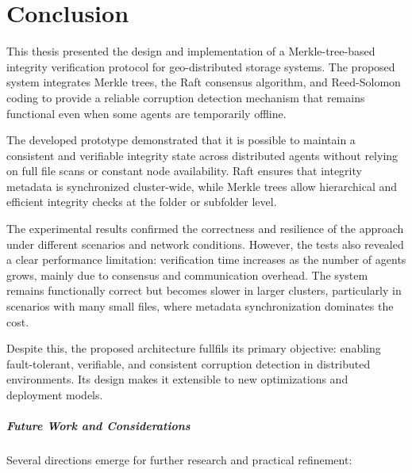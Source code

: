 \chapter{Conclusion}

This thesis presented the design and implementation of a Merkle-tree-based integrity verification protocol for geo-distributed storage systems.
The proposed system integrates Merkle trees, the Raft consensus algorithm, and Reed-Solomon coding to provide a reliable corruption detection mechanism that remains functional even when some agents are temporarily offline.

The developed prototype demonstrated that it is possible to maintain a consistent and verifiable integrity state across distributed agents without relying on full file scans or constant node availability.
Raft ensures that integrity metadata is synchronized cluster-wide, while Merkle trees allow hierarchical and efficient integrity checks at the folder or subfolder level.

The experimental results confirmed the correctness and resilience of the approach under different scenarios and network conditions.
However, the tests also revealed a clear performance limitation: verification time increases as the number of agents grows, mainly due to consensus and communication overhead.
The system remains functionally correct but becomes slower in larger clusters, particularly in scenarios with many small files, where metadata synchronization dominates the cost.

Despite this, the proposed architecture fullfils its primary objective: enabling fault-tolerant, verifiable, and consistent corruption detection in distributed environments.
Its design makes it extensible to new optimizations and deployment models.

\paragraph{Future Work and Considerations}

Several directions emerge for further research and practical refinement:

